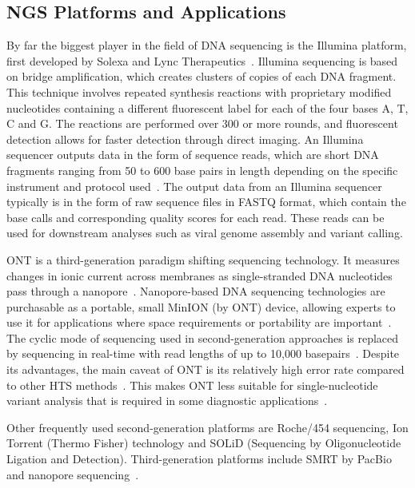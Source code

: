 \subsection{NGS Platforms and Applications}
By far the biggest player in the field of \ac{DNA} sequencing is the Illumina platform, first developed by Solexa and Lync Therapeutics~\cite{illumina2015introduction}. Illumina sequencing is based on bridge amplification, which creates clusters of copies of each \ac{DNA} fragment. This technique involves repeated synthesis reactions with proprietary modified nucleotides containing a different fluorescent label for each of the four bases A, T, C and G. The reactions are performed over 300 or more rounds, and fluorescent detection allows for faster detection through direct imaging. An Illumina sequencer outputs data in the form of sequence reads, which are short \ac{DNA} fragments ranging from 50 to 600 base pairs in length depending on the specific instrument and protocol used~\cite{illumina2015introduction, slatko2018overview, mardis2008next}. The output data from an Illumina sequencer typically is in the form of raw sequence files in FASTQ format, which contain the base calls and corresponding quality scores for each read. These reads can be used for downstream analyses such as viral genome assembly and variant calling.

\ac{ONT} is a third-generation paradigm shifting sequencing technology. It measures changes in ionic current across membranes as single-stranded \ac{DNA} nucleotides pass through a nanopore~\cite{jain2016oxford}. Nanopore-based \ac{DNA} sequencing technologies are purchasable as a portable, small MinION (by \ac{ONT}) device, allowing experts to use it for applications where space requirements or portability are important~\cite{greninger2015rapid, jain2016oxford}. The cyclic mode of sequencing used in second-generation approaches is replaced by sequencing in real-time with read lengths of up to 10,000 basepairs~\cite{jain2016oxford}. Despite its advantages, the main caveat of \ac{ONT} is its relatively high error rate compared to other \ac{HTS} methods~\cite{fu2019comparative}. This makes \ac{ONT} less suitable for single-nucleotide variant analysis that is required in some diagnostic applications~\cite{bowden2019sequencing, stefan2022comparison}.

Other frequently used second-generation platforms are Roche/454 sequencing, Ion Torrent (Thermo Fisher) technology and SOLiD (Sequencing by Oligonucleotide Ligation and Detection). Third-generation platforms include \ac{SMRT} by PacBio and nanopore sequencing~\cite{rhoads2015pacbio}. 

